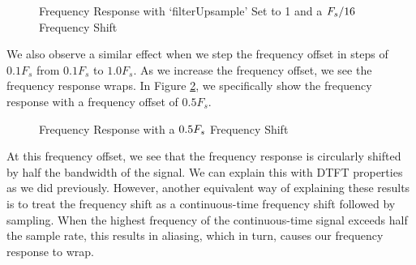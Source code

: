 \documentclass{article}
\begin{document}
\begin{figure}[H]
	\centerline{}
	\caption{Frequency Response with `filterUpsample' Set to 1 and a $\protect{F_s/16}$ Frequency Shift}
	\label{fig::psd_upsample_1_mod_shift}
\end{figure}

\noindent We also observe a similar effect when we step the frequency offset in steps of $0.1F_s$ from $0.1F_s$ to $1.0F_s$. As we increase the frequency offset, we see the frequency response wraps. In Figure \ref{fig::psd_freq_offset_05}, we specifically show the frequency response with a frequency offset of $0.5F_s$. 

\begin{figure}[H]
	\centerline{}
	\caption{Frequency Response with a $\protect{0.5F_s}$ Frequency Shift}
	\label{fig::psd_freq_offset_05}
\end{figure}

\noindent At this frequency offset, we see that the frequency response is circularly shifted by half the bandwidth of the signal. We can explain this with DTFT properties as we did previously. However, another equivalent way of explaining these results is to treat the frequency shift as a continuous-time frequency shift followed by sampling. When the highest frequency of the continuous-time signal exceeds half the sample rate, this results in aliasing, which in turn, causes our frequency response to wrap.
\end{document}
